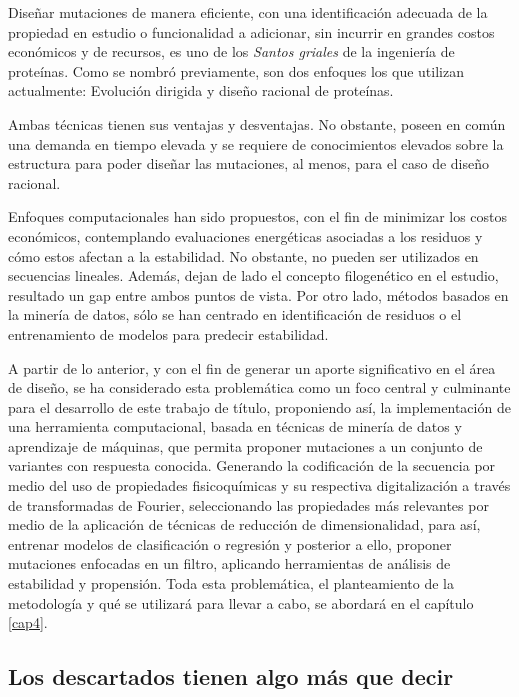Diseñar mutaciones de manera eficiente, con una identificación adecuada de la propiedad en estudio o funcionalidad a adicionar, sin incurrir en grandes costos económicos y de recursos, es uno de los \textit{Santos griales} de la ingeniería de proteínas. Como se nombró previamente, son dos enfoques los que utilizan actualmente: Evolución dirigida y diseño racional de proteínas.

Ambas técnicas tienen sus ventajas y desventajas. No obstante, poseen en común una demanda en tiempo elevada y se requiere de conocimientos elevados sobre la estructura para poder diseñar las mutaciones, al menos, para el caso de diseño racional. 

Enfoques computacionales han sido propuestos, con el fin de minimizar los costos económicos, contemplando evaluaciones energéticas asociadas a los residuos y cómo estos afectan a la estabilidad. No obstante, no pueden ser utilizados en secuencias lineales. Además, dejan de lado el concepto filogenético en el estudio, resultado un gap entre ambos puntos de vista. Por otro lado, métodos basados en la minería de datos, sólo se han centrado en identificación de residuos o el entrenamiento de modelos para predecir estabilidad.

A partir de lo anterior, y con el fin de generar un aporte significativo en el área de diseño, se ha considerado esta problemática como un foco central y culminante para el desarrollo de este trabajo de título, proponiendo así, la implementación de una herramienta computacional, basada en técnicas de minería de datos y aprendizaje de máquinas, que permita proponer mutaciones a un conjunto de variantes con respuesta conocida. Generando la codificación de la secuencia por medio del uso de propiedades fisicoquímicas y su respectiva digitalización a través de transformadas de Fourier, seleccionando las propiedades más relevantes por medio de la aplicación de técnicas de reducción de dimensionalidad, para así, entrenar modelos de clasificación o regresión y posterior a ello, proponer mutaciones enfocadas en un filtro, aplicando herramientas de análisis de estabilidad y propensión. Toda esta problemática, el planteamiento de la metodología y qué se utilizará para llevar a cabo, se abordará en el capítulo \ref{cap4}.


\subsection{Los descartados tienen algo más que decir}


